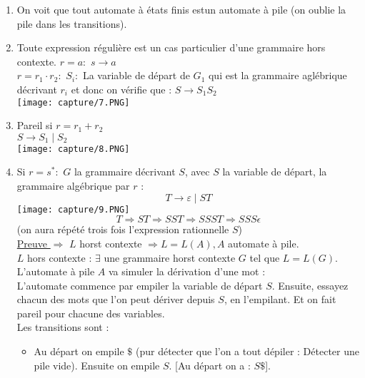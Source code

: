 \documentclass{article}
\begin{document}
    \begin{enumerate}
        \item On voit que tout automate à états finis estun automate à pile (on oublie la pile dans les transitions). \\ 
        \item Toute expression régulière est un cas particulier d'une grammaire hors contexte.
        $r=a : $ $s \rightarrow a$ \\
        $r=r_1 \cdot r_2 :$ $S_i : $ La variable de départ de $G_1$ qui est la grammaire aglébrique décrivant $r_i$ et donc on vérifie que : $S \rightarrow S_1S_2$ \\ 
        \texttt{[image: capture/7.PNG]} \\
        \item Pareil si $r=r_1+r_2$ \\ 
        $S \rightarrow S_1 \mid S_2$ \\
        \texttt{[image: capture/8.PNG]}
        \item Si $r=s^* :$ $G$ la grammaire décrivant $S$, avec $S$ la variable de départ, la grammaire algébrique par $r$ : \\ 
        \begin{equation*}
            T \rightarrow \varepsilon \mid ST
        \end{equation*}
        \texttt{[image: capture/9.PNG]}
        \begin{equation*}
            T \Rightarrow ST \Rightarrow SST \Rightarrow SSST \Rightarrow SSS\epsilon
        \end{equation*}
        (on aura répété trois fois l'expression rationnelle $S$) \\ 
        \underline{Preuve $\Rightarrow$}
        $L$ horst contexte $\Rightarrow L=L(A), A$ automate à pile. \\ 
        $L$ hors contexte : $\exists$ une grammaire horst contexte $G$ tel que $L=L(G)$. L'automate à pile $A$ va simuler la dérivation d'une mot : \\
        L'automate commence par empiler la variable de départ $S$. Ensuite, essayez chacun des mots que l'on peut dériver depuis $S$, en l'empilant. Et on fait pareil pour chacune des variables. \\ 
        Les transitions sont : \\ 
        \begin{itemize}
            \item Au départ on empile $\$$ (pur détecter que l'on a tout dépiler : Détecter une pile vide). Ensuite on empile $S$. [Au départ on a : $S\$$].

\end{itemize}
\end{enumerate}
\end{document}
